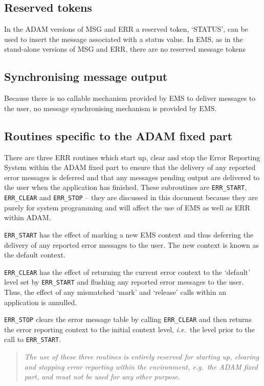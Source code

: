 \documentclass[twoside,11pt]{starlink}
\begin{document}
\subsection{Reserved tokens}
In the ADAM versions of MSG and ERR a reserved token, `STATUS', can be
used to insert the message associated with a status value.
In EMS, as in the stand-alone versions of MSG and ERR, there are no reserved
message tokens

\subsection{Synchronising message output}
Because there is no callable mechanism provided by EMS to deliver messages to
the user, no message synchronising mechanism is provided by EMS.

\subsection{Routines specific
to the ADAM fixed part}
There are three ERR routines which start up, clear and stop the Error Reporting
System within the ADAM fixed part to ensure that the delivery of any
reported error messages is deferred and that any messages pending output are
delivered to the user when the application has finished.
These subroutines are \texttt{ERR\_START}, \texttt{ERR\_CLEAR} and
\texttt{ERR\_STOP} -- they are
discussed in this document because they are purely for system programming and
will affect the use of EMS as well as ERR within ADAM.

\texttt{ERR\_START} has the effect of marking a new EMS context and thus
deferring the delivery of any reported error messages to the user.
The new context is known as the default context.

\texttt{ERR\_CLEAR} has the effect of returning the current error context to
the `default' level set by \texttt{ERR\_START} and flushing any reported error
messages to the user.
Thus, the effect of any mismatched `mark' and `release' calls within an
application is annulled.

\texttt{ERR\_STOP} clears the error message table by calling
\texttt{ERR\_CLEAR} and then returns
the error reporting context to the initial context level, \textit{i.e.}\ the
level prior to the call to \texttt{ERR\_START}.

\begin {quote}
\emph{The use of these three routines is entirely reserved for starting up,
clearing and
stopping error reporting within the environment, \textit{e.g.}\ the ADAM fixed
part, and must not be used for any other purpose.}
\end {quote}
\end{document}
